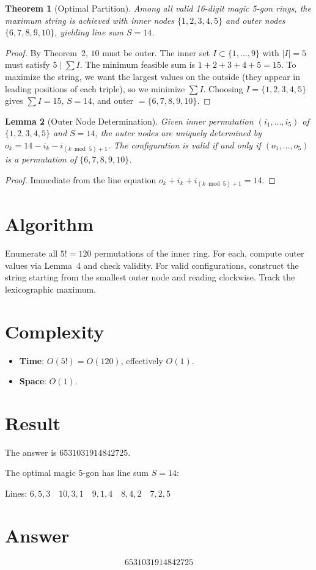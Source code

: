 \documentclass[12pt,a4paper]{article}
\newtheorem{theorem}{Theorem}
\newtheorem{lemma}[theorem]{Lemma}
\begin{document}
\begin{theorem}[Optimal Partition]
Among all valid 16-digit magic 5-gon rings, the maximum string is achieved with inner nodes $\{1, 2, 3, 4, 5\}$ and outer nodes $\{6, 7, 8, 9, 10\}$, yielding line sum $S = 14$.
\end{theorem}

\begin{proof}
By Theorem~2, $10$ must be outer. The inner set $I \subset \{1, \ldots, 9\}$ with $|I| = 5$ must satisfy $5 \mid \sum I$. The minimum feasible sum is $1+2+3+4+5 = 15$. To maximize the string, we want the largest values on the outside (they appear in leading positions of each triple), so we minimize $\sum I$. Choosing $I = \{1,2,3,4,5\}$ gives $\sum I = 15$, $S = 14$, and outer $= \{6,7,8,9,10\}$.
\end{proof}

\begin{lemma}[Outer Node Determination]
Given inner permutation $(i_1, \ldots, i_5)$ of $\{1,2,3,4,5\}$ and $S = 14$, the outer nodes are uniquely determined by $o_k = 14 - i_k - i_{(k \bmod 5)+1}$. The configuration is valid if and only if $(o_1, \ldots, o_5)$ is a permutation of $\{6,7,8,9,10\}$.
\end{lemma}

\begin{proof}
Immediate from the line equation $o_k + i_k + i_{(k \bmod 5)+1} = 14$.
\end{proof}

\section{Algorithm}

Enumerate all $5! = 120$ permutations of the inner ring. For each, compute outer values via Lemma~4 and check validity. For valid configurations, construct the string starting from the smallest outer node and reading clockwise. Track the lexicographic maximum.

\section{Complexity}

\begin{itemize}
    \item \textbf{Time}: $O(5!) = O(120)$, effectively $O(1)$.
    \item \textbf{Space}: $O(1)$.
\end{itemize}

\section{Result}

The answer is $\boxed{6531031914842725}$.

The optimal magic 5-gon has line sum $S = 14$:
\begin{center}
Lines: $6,5,3 \quad 10,3,1 \quad 9,1,4 \quad 8,4,2 \quad 7,2,5$
\end{center}

\section{Answer}

\[
\boxed{6531031914842725}
\]
\end{document}

